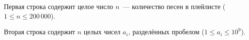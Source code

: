 Первая строка содержит целое число $n$~--- количество песен в плейлисте ($1 \leq n \leq 200\,000$).

Вторая строка содержит $n$ целых чисел $a_i$, разделённых пробелом ($1 \leq a_i \leq 10^9$).